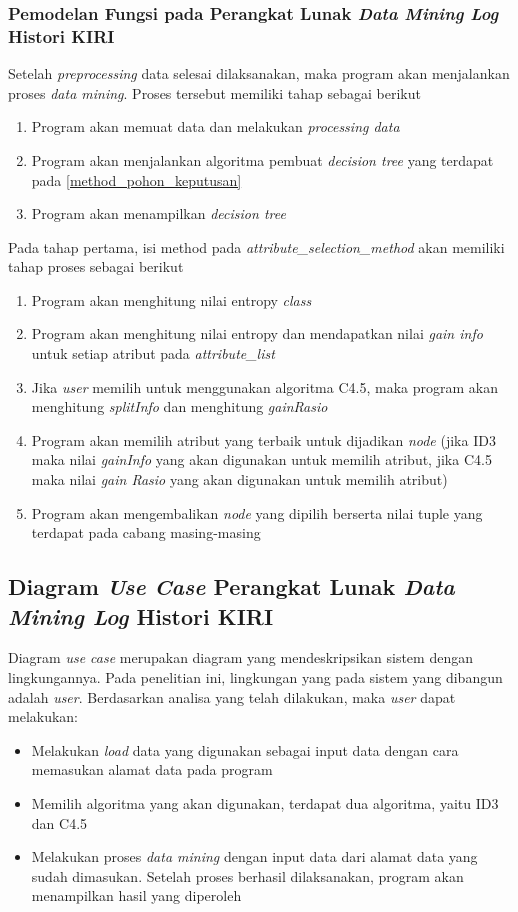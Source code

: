 \subsubsection{Pemodelan Fungsi pada Perangkat Lunak \textsl{Data Mining Log} Histori KIRI}
Setelah \textsl{preprocessing} data selesai dilaksanakan, maka program akan menjalankan proses \textsl{data mining}. Proses tersebut memiliki tahap sebagai berikut
\begin{enumerate}
	\item Program akan memuat data dan melakukan \textsl{processing data}
	\item Program akan menjalankan algoritma pembuat \textsl{decision tree} yang terdapat pada \ref{method_pohon_keputusan}
	\item Program akan menampilkan \textsl{decision tree}
\end{enumerate}  

Pada tahap pertama, isi method pada \textsl{attribute\_selection\_method} akan memiliki tahap proses sebagai berikut
\begin{enumerate}
	\item Program akan menghitung nilai entropy \textsl{class}
	\item Program akan menghitung nilai entropy dan mendapatkan nilai \textsl{gain info} untuk setiap atribut pada \textsl{attribute\_list}
	\item Jika \textsl{user} memilih untuk menggunakan algoritma C4.5, maka program akan menghitung \textsl{splitInfo} dan menghitung \textsl{gainRasio}
	\item Program akan memilih atribut yang terbaik untuk dijadikan \textsl{node} (jika ID3 maka nilai \textsl{gainInfo} yang akan digunakan untuk memilih atribut, jika C4.5 maka nilai \textsl{gain Rasio} yang akan digunakan untuk memilih atribut)
	\item Program akan mengembalikan \textsl{node} yang dipilih berserta nilai tuple yang terdapat pada cabang masing-masing
\end{enumerate}

\subsection{Diagram \textsl{Use Case} Perangkat Lunak \textsl{Data Mining Log} Histori KIRI}

Diagram \textsl{use case} merupakan diagram yang mendeskripsikan sistem dengan lingkungannya. Pada penelitian ini, lingkungan yang pada sistem yang dibangun adalah \textsl{user}. Berdasarkan analisa yang telah dilakukan, maka \textsl{user} dapat melakukan:
\begin{itemize}
	\item Melakukan \textsl{load} data yang digunakan sebagai input data dengan cara memasukan alamat data pada program
	\item Memilih algoritma yang akan digunakan, terdapat dua algoritma, yaitu ID3 dan C4.5
	\item Melakukan proses \textsl{data mining} dengan input data dari alamat data yang sudah dimasukan. Setelah proses berhasil dilaksanakan, program akan menampilkan hasil yang diperoleh
\end{itemize}

